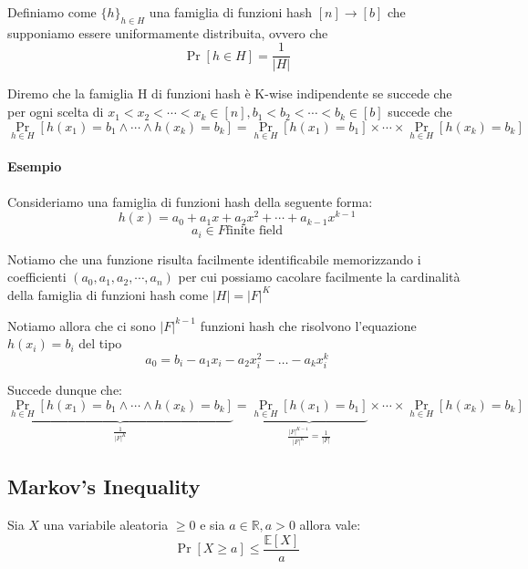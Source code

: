 \documentclass[a4paper,11pt]{book}
\begin{document}
Definiamo come $\{ h \}_{h \in H}$ una famiglia di funzioni hash $[n] \rightarrow [b]$ che supponiamo essere uniformamente distribuita, ovvero che $$ \Pr[h \in H] = \frac{1}{|H|}$$

Diremo che la famiglia H di funzioni hash \`e K-wise indipendente se succede che per ogni scelta di $x_1 < x_2 < \cdots < x_k \in [n], b_1 < b_2 < \cdots < b_k \in [b]$ succede che 
$$\Pr_{h \in H}[h(x_1) = b_1 \wedge \cdots \wedge h(x_k) = b_k] = \Pr_{h \in H}[h(x_1) = b_1] \times \cdots \times \Pr_{h \in H}[h(x_k) = b_k]$$

\paragraph{Esempio}

Consideriamo una famiglia di funzioni hash della seguente forma: $$h(x) = a_0 + a_1 x + a_2 x^2 + \cdots + a_{k-1} x^{k-1}$$ $$ a_i \in F \mbox{finite field}$$

Notiamo che una funzione risulta facilmente identificabile memorizzando i coefficienti $(a_0, a_1, a_2, \cdots, a_n)$ per cui possiamo cacolare facilmente la cardinalit\`a della famiglia di funzioni hash come $|H| = |F|^K$

Notiamo allora che ci sono $|F|^{k-1}$ funzioni hash che risolvono l'equazione $h(x_i) = b_i$ del tipo $$a_0 = b_i - a_1 x_i - a_2 x_i^{2} - \ldots - a_k x_i^{k}$$

Succede dunque che:
$$\underbrace{\Pr_{h \in H}[h(x_1) = b_1 \wedge \cdots \wedge h(x_k) = b_k]}_{\frac{1}{|F|^K}} = \underbrace{\Pr_{h \in H}[h(x_1) = b_1]}_{\frac{|F|^{K-1}}{|F|^K} = \frac{1}{|F|}} \times \cdots \times \Pr_{h \in H}[h(x_k) = b_k]$$

\subsection{Markov's Inequality}

Sia $X$ una variabile aleatoria $ \geq 0$ e sia $a \in \mathbb{R}, a > 0$ allora vale: $$\Pr[X \geq a] \leq \frac{\mathbb{E}[X]}{a}$$
\end{document}
